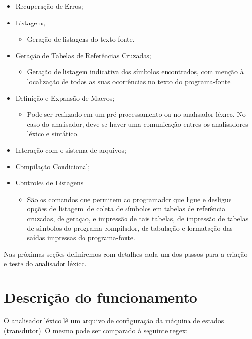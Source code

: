 \begin{itemize}
	\item Recuperação de Erros;
	
	\item Listagens;
	\begin{itemize}
		\item Geração de listagens do texto-fonte.
	\end{itemize}
	
	\item Geração de Tabelas de Referências Cruzadas;
	\begin{itemize}
		\item Geração de listagem indicativa dos símbolos encontrados, com menção à localização de todas as suas ocorrências no texto do programa-fonte.
	\end{itemize}
	
	\item Definição e Expansão de Macros;
	\begin{itemize}
		\item Pode ser realizado em um pré-processamento ou no analisador léxico. No caso do analisador, deve-se haver uma comunicação entres os analisadores léxico e sintático.
	\end{itemize}
	
	\item Interação com o sistema de arquivos;
	
	\item Compilação Condicional;
	
	\item Controles de Listagens.
	\begin{itemize}
		\item São os comandos que permitem ao programador que ligue e desligue opções de listagem, de coleta de símbolos em tabelas de referência cruzadas, de geração, e impressão de tais tabelas, de impressão de tabelas de símbolos do programa compilador, de tabulação e formatação das saídas impressas do programa-fonte.
	\end{itemize}

\end{itemize}

Nas próximas seções definiremos com detalhes cada um dos passos para a criação e teste do analisador léxico.


\section{Descrição do funcionamento}

O analisador léxico lê um arquivo de configuração da máquina de estados
(transdutor). O mesmo pode ser comparado à seguinte regex:

